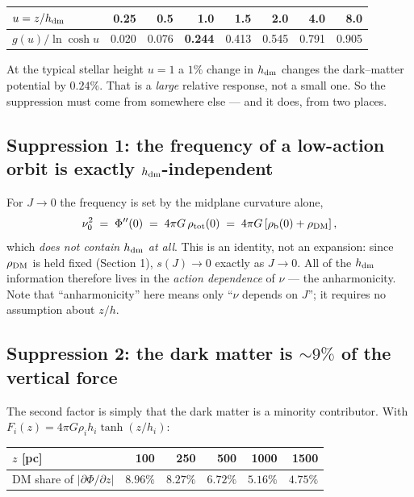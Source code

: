 \documentclass[11pt,a4paper]{article}
\newcommand{\hdm}{h_{\rm dm}}
\begin{document}
\begin{center}
\begin{tabular}{lrrrrrrr}
\toprule
$u=z/\hdm$ & 0.25 & 0.5 & \textbf{1.0} & 1.5 & 2.0 & 4.0 & 8.0 \\
\midrule
$g(u)/\ln\cosh u$ & 0.020 & 0.076 & \textbf{0.244} & 0.413 & 0.545 & 0.791 & 0.905 \\
\bottomrule
\end{tabular}
\end{center}

\noindent At the typical stellar height $u=1$ a $1\%$ change in $\hdm$ changes
the dark--matter potential by $0.24\%$.  That is a \emph{large} relative
response, not a small one.  So the suppression must come from somewhere else ---
and it does, from two places.

\subsection{Suppression 1: the frequency of a low-action orbit is exactly
$\hdm$-independent}

For $J\to0$ the frequency is set by the midplane curvature alone,
\begin{equation}
  \nu_0^2 \;=\; \Phi''(0) \;=\; 4\pi G\,\rho_{\rm tot}(0)
              \;=\; 4\pi G\left[\rho_{\rm b}(0) + \rho_{\rm DM}\right],
\end{equation}
which \emph{does not contain $\hdm$ at all}.  This is an identity, not an
expansion: since $\rho_{\rm DM}$ is held fixed (Section 1), $s(J)\to 0$ exactly
as $J\to0$.  All of the $\hdm$ information therefore lives in the \emph{action
dependence} of $\nu$ --- the anharmonicity.  Note that ``anharmonicity'' here
means only ``$\nu$ depends on $J$''; it requires no assumption about $z/h$.

\subsection{Suppression 2: the dark matter is $\sim\!9\%$ of the vertical force}

The second factor is simply that the dark matter is a minority contributor.  With
$F_i(z) = 4\pi G\rho_i h_i \tanh(z/h_i)$:

\begin{center}
\begin{tabular}{lrrrrr}
\toprule
$z$ [pc] & 100 & 250 & 500 & 1000 & 1500 \\
\midrule
DM share of $|\partial\Phi/\partial z|$ & $8.96\%$ & $8.27\%$ & $6.72\%$ & $5.16\%$ & $4.75\%$ \\
\bottomrule
\end{tabular}
\end{center}
\end{document}
